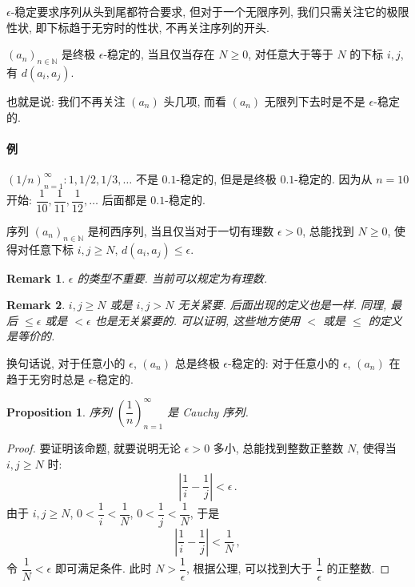 \documentclass[UTF8]{ctexart}
\theoremstyle{mystyle}
\newtheorem{proposition}{Proposition}[section]
\theoremstyle{myremark}
\newtheorem*{remark}{Remark}
\theoremstyle{plain}
\newcommand{\N}{\mathbb N}
\begin{document}
$ \epsilon $-稳定要求序列从头到尾都符合要求, 但对于一个无限序列, 我们只需关注它的极限性状, 即下标趋于无穷时的性状, 不再关注序列的开头.

\begin{definition}
    $ (a_n)_{n \in \N} $ 是终极 $ \epsilon $-稳定的, 当且仅当存在 $ N \geqslant 0 $, 对任意大于等于 $ N $ 的下标 $ i, j $, 有 $ d(a_i, a_j) $.
\end{definition}

也就是说: 我们不再关注 $ (a_n) $ 头几项, 而看 $ (a_n) $ 无限列下去时是不是 $ \epsilon $-稳定的.

\paragraph{例}
$ (1/n)_{n = 1}^\infty \colon 1, 1/2, 1/3, \dots $ 不是 $ 0.1 $-稳定的, 但是是终极 $ 0.1 $-稳定的. 因为从 $ n = 10 $ 开始: $ \dfrac{1}{10}, \dfrac{1}{11}, \dfrac{1}{12}, \dots $ 后面都是 $ 0.1 $-稳定的.


\begin{definition}
    序列 $ (a_n)_{n \in \N} $ 是柯西序列, 当且仅当对于一切有理数 $ \epsilon > 0 $, 总能找到 $ N \geqslant 0 $, 使得对任意下标 $ i, j \geqslant N $, $ d(a_i, a_j) \leqslant \epsilon $.
\end{definition}

\begin{remark}
    $ \epsilon $ 的类型不重要. 当前可以规定为有理数.
\end{remark}

\begin{remark}
    $ i, j \geqslant N $ 或是 $ i, j > N $ 无关紧要. 后面出现的定义也是一样. 同理, 最后 $ \leqslant \epsilon $ 或是 $ < \epsilon $ 也是无关紧要的. 可以证明, 这些地方使用 $ < $ 或是 $ \leqslant $ 的定义是等价的.
\end{remark}

换句话说, 对于任意小的 $ \epsilon $, $ (a_n) $ 总是终极 $ \epsilon $-稳定的: 对于任意小的 $ \epsilon $, $ (a_n) $ 在趋于无穷时总是 $ \epsilon $-稳定的.


\begin{proposition}
    序列 $ \left( \dfrac{1}{n} \right)_{n = 1}^\infty $ 是 Cauchy 序列.
\end{proposition}

\begin{proof}
    要证明该命题, 就要说明无论 $ \epsilon > 0 $ 多小, 总能找到整数正整数 $ N $, 使得当 $ i, j \geqslant N $ 时: \[ \left| \dfrac{1}{i} - \dfrac{1}{j} \right| < \epsilon \,.\]
    由于 $ i, j \geqslant N $, $ 0 < \dfrac{1}{i} < \dfrac{1}{N} $, $ 0 < \dfrac{1}{j} < \dfrac{1}{N} $, 于是 \[ \left| \dfrac{1}{i} - \dfrac{1}{j} \right| < \dfrac{1}{N} \,,\]
    令 $ \dfrac{1}{N} < \epsilon $ 即可满足条件. 此时 $ N > \dfrac{1}{\epsilon} $, 根据公理, 可以找到大于 $ \dfrac{1}{\epsilon} $ 的正整数.
\end{proof}
\end{document}
